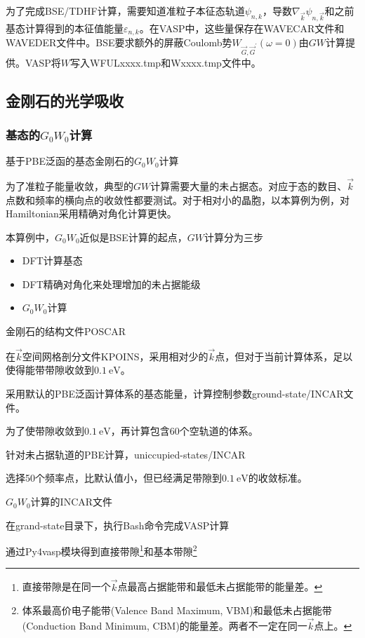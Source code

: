 为了完成\textrm{BSE/TDHF}计算，需要知道准粒子本征态轨道$\psi_{n,k}$，导数$\nabla_{\vec k}\psi_{n,\vec k}$和之前基态计算得到的本征值能量$\varepsilon_{n,k}$。在\textrm{VASP}中，这些量保存在\textrm{WAVECAR}文件和\textrm{WAVEDER}文件中。\textrm{BSE}要求额外的屏蔽\textrm{Coulomb}势$W_{\vec G,\vec G^{\prime}}(\omega=0)$由$GW$计算提供。\textrm{VASP}将$W$写入\textrm{WFULxxxx.tmp}和\textrm{Wxxxx.tmp}文件中。

\subsection{金刚石的光学吸收}
\subsubsection{基态的$G_0W_0$计算}
基于\textrm{PBE}泛函的基态金刚石的$G_0W_0$计算

为了准粒子能量收敛，典型的$GW$计算需要大量的未占据态。对应于态的数目、$\vec k$点数和频率的横向点的收敛性都要测试。对于相对小的晶胞，以本算例为例，对\textrm{Hamiltonian}采用精确对角化计算更快。

本算例中，$G_0W_0$近似是\textrm{BSE}计算的起点，$GW$计算分为三步
\begin{itemize}
	\item \textrm{DFT}计算基态
	\item \textrm{DFT}精确对角化来处理增加的未占据能级
	\item $G_0W_0$计算
\end{itemize}

金刚石的结构文件\textrm{POSCAR}

在$\vec k$空间网格剖分文件\textrm{KPOINS}，采用相对少的$\vec k$点，但对于当前计算体系，足以使得能带带隙收敛到$0.1~\mathrm{eV}$。


采用默认的\textrm{PBE}泛函计算体系的基态能量，计算控制参数\textrm{ground-state/INCAR}文件。

为了使带隙收敛到$0.1~\mathrm{eV}$，再计算包含60个空轨道的体系。

针对未占据轨道的\textrm{PBE}计算，\textrm{uniccupied-states/INCAR}


选择50个频率点，比默认值小，但已经满足带隙到$0.1~\mathrm{eV}$的收敛标准。

$G_0W_0$计算的\textrm{INCAR}文件

在\textrm{grand-state}目录下，执行\textrm{Bash}命令完成\textrm{VASP}计算

通过\textrm{Py4vasp}模块得到直接带隙\footnote{直接带隙是在同一个$\vec k$点最高占据能带和最低未占据能带的能量差。}和基本带隙\footnote{体系最高价电子能带\textrm{(Valence Band Maximum, VBM)}和最低未占据能带\textrm{(Conduction Band Minimum, CBM)}的能量差。两者不一定在同一$\vec k$点上。}

